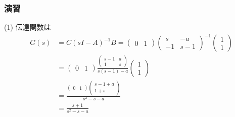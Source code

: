 \begin{frame}[t]
\frametitle{演習}
(1) 伝達関数は
\begin{align*}
	G(s)&= C (sI-A)^{-1} B 
	=
	\left(\begin{array}{cc}
 		    0      & 1   
		\end{array}\right)
	\left(\begin{array}{cc}
	     s      & -a  \\
	     -1      & s-1
		\end{array}\right)^{-1}
	\left(\begin{array}{c}
	     1 \\
	     1 
	\end{array}\right)
\\
	&=
	\left(\begin{array}{cc}
 		    0      & 1   
		\end{array}\right)
	\frac{
	\left(\begin{array}{cc}
	     s-1      & a  \\
	     1      & s
		\end{array}\right)
	}{s(s-1)-a}
	\left(\begin{array}{c}
	     1 \\
	     1 
	\end{array}\right)
\\
	&=
	\frac{
	\left(\begin{array}{cc}
 		    0      & 1   
		\end{array}\right)
	\left(\begin{array}{c}
	     s-1 + a  \\
	     1   +  s
		\end{array}\right)
	}{s^2-s-a}
\\
	&=\frac{s+1}{s^2-s-a}
\end{align*}

\end{frame}



